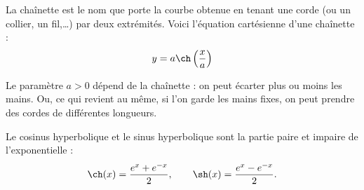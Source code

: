 \auteur{}

\begin{minipage}{0.49\textwidth}
	La chaînette est le nom que porte la courbe obtenue en tenant 
	une corde (ou un collier, un fil,\ldots) par deux extrémités.
	Voici l'équation cartésienne d'une chaînette :
	$$y = a \ch\left( \frac x a \right)$$  
	
	Le paramètre $a>0$ dépend de la chaînette : on peut écarter plus ou moins les mains.
Ou, ce qui revient au même, si l'on garde les mains fixes, on peut prendre des cordes de différentes longueurs.
	\end{minipage}
\hfill
	\begin{minipage}{0.5\textwidth}
	\end{minipage}
			
			
Le cosinus hyperbolique et le sinus hyperbolique sont la partie paire et impaire de l'exponentielle :
$$\ch(x) = \frac{e^x + e^{-x}}{2}, \qquad \sh(x) = \frac{e^x - e^{-x}}{2}.$$


